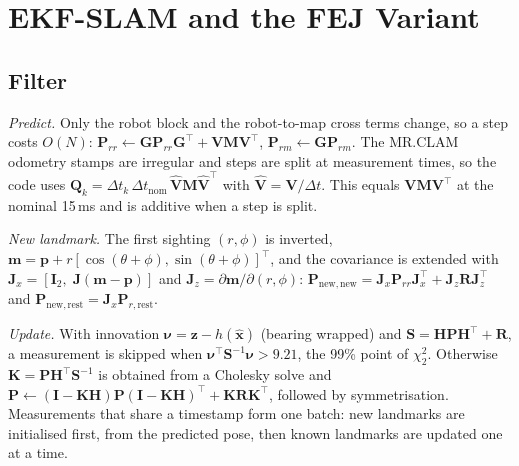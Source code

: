 \documentclass[conference]{IEEEtran}
\newcommand{\vect}[1]{\mathbf{#1}}
\newcommand{\T}{^{\top}}
\newcommand{\hx}{\hat{\vect{x}}}
\begin{document}
\section{EKF-SLAM and the FEJ Variant}
\subsection{Filter}
\emph{Predict.} Only the robot block and the robot-to-map cross terms change, so a step costs $O(N)$:
$\vect{P}_{rr} \leftarrow \vect{G}\vect{P}_{rr}\vect{G}\T + \vect{V}\vect{M}\vect{V}\T$, $\vect{P}_{rm} \leftarrow \vect{G}\vect{P}_{rm}$.
The MR.CLAM odometry stamps are irregular and steps are split at measurement times, so the code uses $\vect{Q}_k = \Delta t_k\,\Delta t_{\mathrm{nom}}\,\hat{\vect{V}}\vect{M}\hat{\vect{V}}\T$ with $\hat{\vect{V}} = \vect{V}/\Delta t$. This equals $\vect{V}\vect{M}\vect{V}\T$ at the nominal 15\,ms and is additive when a step is split.

\emph{New landmark.} The first sighting $(r, \phi)$ is inverted, $\vect{m} = \vect{p} + r[\cos(\theta+\phi), \sin(\theta+\phi)]\T$, and the covariance is extended with $\vect{J}_x = [\vect{I}_2,\; \vect{J}(\vect{m}-\vect{p})]$ and $\vect{J}_z = \partial\vect{m}/\partial(r,\phi)$: $\vect{P}_{\mathrm{new,new}} = \vect{J}_x\vect{P}_{rr}\vect{J}_x\T + \vect{J}_z\vect{R}\vect{J}_z\T$ and $\vect{P}_{\mathrm{new,rest}} = \vect{J}_x\vect{P}_{r,\mathrm{rest}}$.

\emph{Update.} With innovation $\boldsymbol{\nu} = \vect{z} - h(\hx)$ (bearing wrapped) and $\vect{S} = \vect{H}\vect{P}\vect{H}\T + \vect{R}$, a measurement is skipped when $\boldsymbol{\nu}\T\vect{S}^{-1}\boldsymbol{\nu} > 9.21$, the 99\% point of $\chi^2_2$. Otherwise $\vect{K} = \vect{P}\vect{H}\T\vect{S}^{-1}$ is obtained from a Cholesky solve and $\vect{P} \leftarrow (\vect{I}-\vect{K}\vect{H})\vect{P}(\vect{I}-\vect{K}\vect{H})\T + \vect{K}\vect{R}\vect{K}\T$, followed by symmetrisation. Measurements that share a timestamp form one batch: new landmarks are initialised first, from the predicted pose, then known landmarks are updated one at a time.
\end{document}
